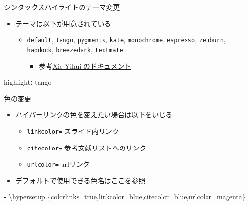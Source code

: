 \documentclass[
  12pt,
  ignorenonframetext,
]{beamer}
\newenvironment{Shaded}{\begin{snugshade}}{\end{snugshade}}
\newcommand{\AttributeTok}[1]{\textcolor[rgb]{0.77,0.63,0.00}{#1}}
\newcommand{\FunctionTok}[1]{\textcolor[rgb]{0.00,0.00,0.00}{#1}}
\newcommand{\KeywordTok}[1]{\textcolor[rgb]{0.13,0.29,0.53}{\textbf{#1}}}
\providecommand{\tightlist}{%
  \setlength{\itemsep}{0pt}\setlength{\parskip}{0pt}}
\begin{document}
\begin{frame}[fragile]{シンタックスハイライトのテーマ変更}
\protect\hypertarget{ux30b7ux30f3ux30bfux30c3ux30afux30b9ux30cfux30a4ux30e9ux30a4ux30c8ux306eux30c6ux30fcux30deux5909ux66f4}{}

\begin{itemize}
\tightlist
\item
  テーマは以下が用意されている

  \begin{itemize}
  \tightlist
  \item
    \texttt{default}, \texttt{tango}, \texttt{pygments}, \texttt{kate},
    \texttt{monochrome}, \texttt{espresso}, \texttt{zenburn},
    \texttt{haddock}, \texttt{breezedark}, \texttt{textmate}

    \begin{itemize}
    \tightlist
    \item
      参考\href{https://bookdown.org/yihui/rmarkdown/html-document.html}{Xie
      Yihui のドキュメント}
    \end{itemize}
  \end{itemize}
\end{itemize}

\begin{Shaded}
\begin{Highlighting}[]
\FunctionTok{highlight}\KeywordTok{:}\AttributeTok{ tango}
\end{Highlighting}
\end{Shaded}

\end{frame}

\begin{frame}[fragile]{色の変更}
\protect\hypertarget{ux8272ux306eux5909ux66f4}{}

\begin{itemize}
\tightlist
\item
  ハイパーリンクの色を変えたい場合は以下をいじる

  \begin{itemize}
  \tightlist
  \item
    \texttt{linkcolor=} スライド内リンク
  \item
    \texttt{citecolor=} 参考文献リストへのリンク
  \item
    \texttt{urlcolor=} urlリンク
  \end{itemize}
\item
  デフォルトで使用できる色名は\href{http://www.latex-cmd.com/style/color.html}{ここ}を参照
\end{itemize}

\begin{Shaded}
\begin{Highlighting}[]
\AttributeTok{  }\KeywordTok{-}\AttributeTok{ \textbackslash{}hypersetup \{colorlinks=true,linkcolor=blue,citecolor=blue,urlcolor=magenta\}}
\end{Highlighting}
\end{Shaded}

\end{frame}
\end{document}
